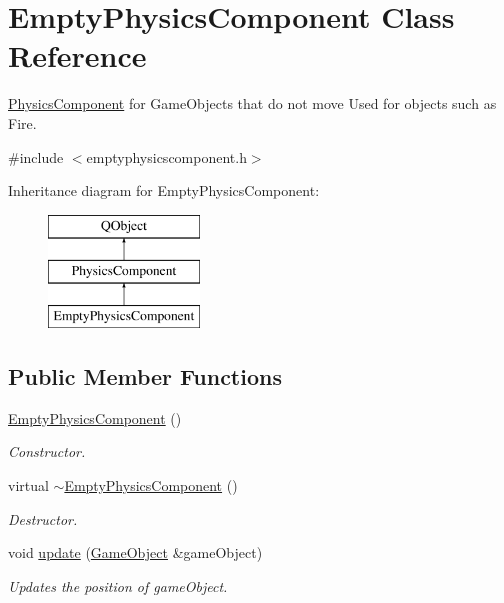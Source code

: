 \hypertarget{classEmptyPhysicsComponent}{\section{Empty\-Physics\-Component Class Reference}
\label{classEmptyPhysicsComponent}
}


\hyperlink{classPhysicsComponent}{Physics\-Component} for Game\-Objects that do not move Used for objects such as Fire.  




{\ttfamily \#include $<$emptyphysicscomponent.\-h$>$}

Inheritance diagram for Empty\-Physics\-Component\-:\begin{figure}[H]
\begin{center}
\leavevmode
\includegraphics[height=3.000000cm]{classEmptyPhysicsComponent}
\end{center}
\end{figure}
\subsection*{Public Member Functions}
\begin{DoxyCompactItemize}
\item 
\hypertarget{classEmptyPhysicsComponent_af8b7cc144f6cf386168a6728329ee5af}{\hyperlink{classEmptyPhysicsComponent_af8b7cc144f6cf386168a6728329ee5af}{Empty\-Physics\-Component} ()}\label{classEmptyPhysicsComponent_af8b7cc144f6cf386168a6728329ee5af}

\begin{DoxyCompactList}\small\item\em Constructor. \end{DoxyCompactList}\item 
\hypertarget{classEmptyPhysicsComponent_ac2af2630a822087545750e0be469829f}{virtual \hyperlink{classEmptyPhysicsComponent_ac2af2630a822087545750e0be469829f}{$\sim$\-Empty\-Physics\-Component} ()}\label{classEmptyPhysicsComponent_ac2af2630a822087545750e0be469829f}

\begin{DoxyCompactList}\small\item\em Destructor. \end{DoxyCompactList}\item 
void \hyperlink{classEmptyPhysicsComponent_af1d5179fe8277973c4e1169ffc4f018d}{update} (\hyperlink{classGameObject}{Game\-Object} \&game\-Object)
\begin{DoxyCompactList}\small\item\em Updates the position of game\-Object. \end{DoxyCompactList}\end{DoxyCompactItemize}
